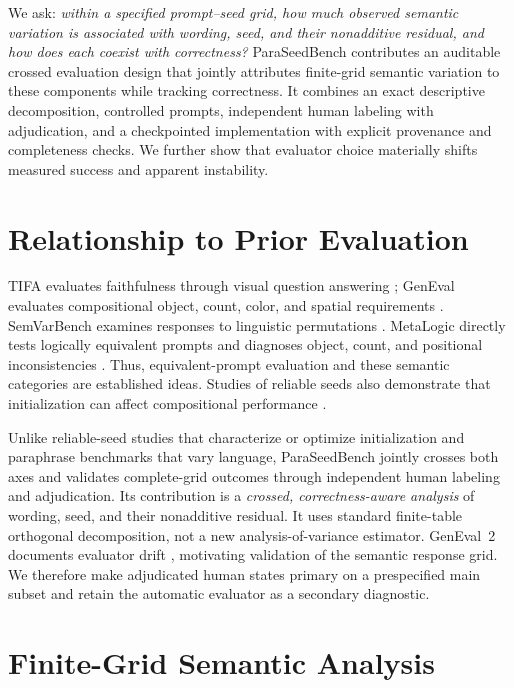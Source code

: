 \documentclass[10pt,letterpaper]{article}
\begin{document}
We ask: \emph{within a specified prompt--seed grid, how much observed semantic variation is associated with wording, seed, and their nonadditive residual, and how does each coexist with correctness?} ParaSeedBench contributes an auditable crossed evaluation design that jointly attributes finite-grid semantic variation to these components while tracking correctness. It combines an exact descriptive decomposition, controlled prompts, independent human labeling with adjudication, and a checkpointed implementation with explicit provenance and completeness checks. We further show that evaluator choice materially shifts measured success and apparent instability.

\section{Relationship to Prior Evaluation}
TIFA evaluates faithfulness through visual question answering \cite{tifa}; GenEval evaluates compositional object, count, color, and spatial requirements \cite{geneval}. SemVarBench examines responses to linguistic permutations \cite{semvar}. MetaLogic directly tests logically equivalent prompts and diagnoses object, count, and positional inconsistencies \cite{metalogic}. Thus, equivalent-prompt evaluation and these semantic categories are established ideas. Studies of reliable seeds also demonstrate that initialization can affect compositional performance \cite{seeds}.

Unlike reliable-seed studies that characterize or optimize initialization and paraphrase benchmarks that vary language, ParaSeedBench jointly crosses both axes and validates complete-grid outcomes through independent human labeling and adjudication. Its contribution is a \emph{crossed, correctness-aware analysis} of wording, seed, and their nonadditive residual. It uses standard finite-table orthogonal decomposition, not a new analysis-of-variance estimator. GenEval~2 documents evaluator drift \cite{geneval2}, motivating validation of the semantic response grid. We therefore make adjudicated human states primary on a prespecified main subset and retain the automatic evaluator as a secondary diagnostic.

\section{Finite-Grid Semantic Analysis}
\end{document}
